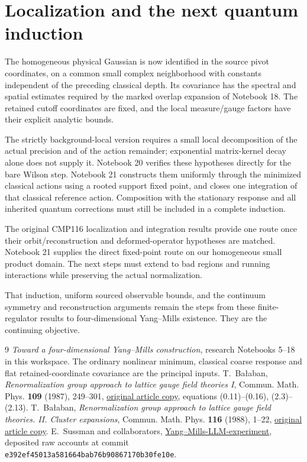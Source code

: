 \section{Localization and the next quantum induction}
\label{ps19-next}

The homogeneous physical Gaussian is now identified in the source
pivot coordinates, on a common small complex neighborhood with
constants independent of the preceding classical depth. Its
covariance has the spectral and spatial estimates required by
the marked overlap expansion of Notebook 18. The retained
cutoff coordinates are fixed, and the local measure/gauge
factors have their explicit analytic bounds.

The strictly background-local version requires a small local
decomposition of the actual precision and of the action
remainder; exponential matrix-kernel decay alone does not
supply it. Notebook 20 verifies these hypotheses directly for
the bare Wilson step. Notebook 21 constructs them uniformly
through the minimized classical actions using a rooted support
fixed point, and closes one integration of that classical
reference action. Composition with the stationary response
and all inherited quantum corrections must still be included
in a complete induction.

The original CMP116 localization and integration results provide
one route once their orbit/reconstruction and deformed-operator
hypotheses are matched. Notebook 21 supplies the direct
fixed-point route on our homogeneous small product domain.
The next steps must extend to bad regions and running
interactions while preserving the actual normalization.

That induction, uniform sourced observable bounds, and the
continuum symmetry and reconstruction arguments remain the
steps from these finite-regulator results to four-dimensional
Yang--Mills existence. They are the continuing objective.

\begin{thebibliography}{9}
\emph{Toward a four-dimensional Yang--Mills construction},
research Notebooks 5--18 in this workspace. The ordinary nonlinear
minimum, classical coarse response and flat retained-coordinate
covariance are the principal inputs.
T.~Ba\l aban,
\emph{Renormalization group approach to lattice gauge field
theories I}, Commun. Math. Phys. \textbf{109} (1987), 249--301,
\href{https://scispace.com/pdf/renormalization-group-approach-to-lattice-gauge-field-3ygai0vxt1.pdf}{original article copy},
equations (0.11)--(0.16), (2.3)--(2.13).
T.~Ba\l aban,
\emph{Renormalization group approach to lattice gauge field
theories. II. Cluster expansions},
Commun. Math. Phys. \textbf{116} (1988), 1--22,
\href{https://scispace.com/pdf/renormalization-group-approach-to-lattice-gauge-field-4penm4k7hc.pdf}{original article copy}.
E.~Sussman and collaborators,
\href{https://github.com/ethanwsussman/Yang--Mills-LLM-experiment}{Yang--Mills-LLM-experiment},
deposited raw accounts at commit
\texttt{e392ef45013a581664bab76b90867170b30fe10e}.
\end{thebibliography}

